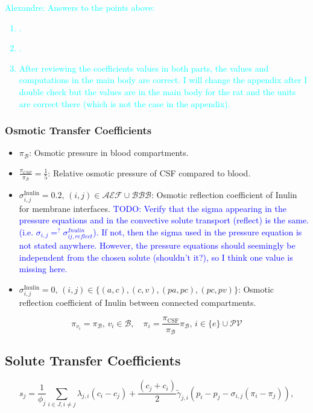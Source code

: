 \documentclass{article}
\theoremstyle{definition}
\theoremstyle{plain}
\theoremstyle{remark}
\newcommand{\TODO}[1]{\textcolor{blue}{TODO: #1}}
\newcommand{\AP}[1]{\textcolor{cyan}{Alexandre: #1}}
\begin{document}
\AP{Answers to the points above: \begin{enumerate}
    \item .
    \item .
    \item After reviewing the coefficients values in both parts, the values and computations in the main body are correct. I will change the appendix after I double check but the values are in the main body for the rat and the units are correct there (which is not the case in the appendix). 
\end{enumerate}}

\subsubsection*{Osmotic Transfer Coefficients}
\begin{itemize}
    \item $\pi_\mathcal{B}$: Osmotic pressure in blood compartments. 
    \item $\frac{\pi_{CSF}}{\pi_{\mathcal{B}}} = \frac{1}{5}$: Relative osmotic pressure of CSF compared to blood.
    \item $\sigma_{i, j}^{\text{Inulin}} = 0.2, \, (i, j) \in \mathcal{AEF}\cup\mathcal{BBB}$: Osmotic reflection coefficient of Inulin for membrane interfaces.
        \TODO{Verify that the sigma appearing in the pressure equations and in the convective solute transport (reflect) is the same. (i.e. \( \sigma_{i,j} =^? \sigma^{Inulin}_{ij, reflect} \)). If not, then the sigma used in the pressure equation is not stated anywhere. However, the pressure equations should seemingly be independent from the chosen solute (shouldn't it?), so I think one value is missing here.}
    \item $\sigma_{i, j}^{\text{Inulin}} = 0, \, (i, j) \in \{(a, c), (c, v), (pa, pc), (pc, pv)\} $: Osmotic reflection coefficient of Inulin between connected compartments.
\end{itemize}
\begin{equation}
    \pi_{v_i} = \pi_\mathcal{B}, \, v_i \in \mathcal{B}, \quad \pi_{i} = \frac{\pi_\text{CSF}}{\pi_\mathcal{B}}\pi_{\mathcal{B}}, \, i \in \{e\} \cup \mathcal{PV} 
\label{eq: osmotic pressures} 
\end{equation}


\subsection*{Solute Transfer Coefficients}
\begin{equation}
    s_j = \frac{1}{\phi_j}  \sum_{i\in J, i\neq j}\lambda_{j , i} ( c_i- c_j) +  \frac{(c_j+c_i)}{2} \tilde \gamma_{j , i} (p_i - p_j-\sigma_{i,j}(\pi_i-\pi_j)) ,
\end{equation}
\end{document}
